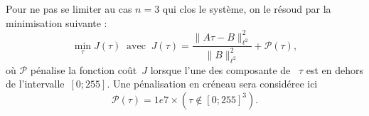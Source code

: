 \documentclass[main.tex]{subfiles}
\begin{document}
Pour ne pas se limiter au cas $n=3$ qui clos le système, on le résoud par la minimisation suivante :
\begin{equation}\label{eq:min_optim_grey}
\min_{\tau} J(\tau) \ \textrm{ avec } \ J(\tau)= \dfrac{\| A\tau - B \|^2_{\ell^2}}{\|B\|^2_{\ell^2}} + \mathcal{P}(\tau),
\end{equation}
où $\mathcal{P}$ pénalise la fonction coût~$J$ lorsque l'une des composante de ~$\tau$ est en dehors de l'intervalle~$[0;255]$. 
Une pénalisation en créneau sera considéree ici
\begin{equation}
\label{eq:penalisation_creneau}
\mathcal{P}(\tau) = 1e7 \times ( \tau \notin  [0;255]^3 ).
\end{equation}
\end{document}
